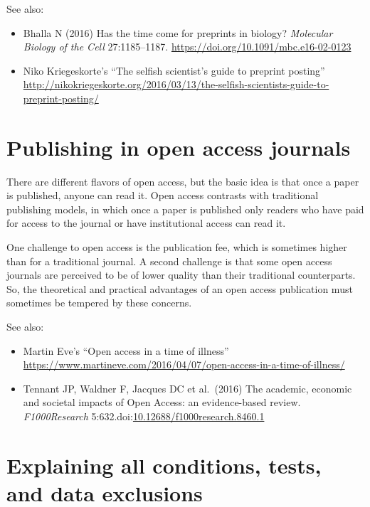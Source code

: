 \documentclass[letterpaper,oneside,11pt,article, portrait]{memoir}
\newcommand{\doi}[1]{doi:\href{http://dx.doi.org/#1}{#1}}
\newcommand{\journal}[1]{\textit{#1}} 			%
\begin{document}
\vspace{1em} \noindent See also:

\begin{itemize}
\item Bhalla N (2016) Has the time come for preprints in biology? \journal{Molecular Biology of the Cell} 27:1185--1187. \url{https://doi.org/10.1091/mbc.e16-02-0123}
\item Niko Kriegeskorte's ``The selfish scientist's guide to preprint posting'' \url{http://nikokriegeskorte.org/2016/03/13/the-selfish-scientists-guide-to-preprint-posting/}
\end{itemize}

\chapter{Publishing in open access journals} \label{openaccess}

There are different flavors of open access, but the basic idea is that once a paper is published, anyone can read it. Open access contrasts with traditional publishing models, in which once a paper is published only readers who have paid for access to the journal or have institutional access can read it.

One challenge to open access is the publication fee, which is sometimes higher than for a traditional journal. A second challenge is that some open access journals are perceived to be of lower quality than their traditional counterparts. So, the theoretical and practical advantages of an open access publication must sometimes be tempered by these concerns.

\vspace{1em} \noindent See also:

\begin{itemize}
\item Martin Eve's ``Open access in a time of illness'' \newline \url{https://www.martineve.com/2016/04/07/open-access-in-a-time-of-illness/}
\item Tennant JP, Waldner F, Jacques DC et al.\ (2016) The academic, economic and societal impacts of Open Access: an evidence-based review. \journal{F1000Research} 5:632.\newline \doi{10.12688/f1000research.8460.1}
\end{itemize}


\chapter{Explaining all conditions, tests, and data exclusions} \label{explainAllTests}
\end{document}
